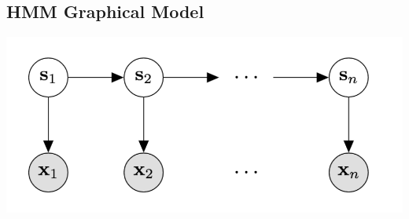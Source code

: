 \documentclass[12pt]{article}
\begin{document}
%
%	
%


\subsection{HMM Graphical Model}

\begin{center}
	\includegraphics[scale = 0.4]{hmm_generic.jpg}
\end{center}
\end{document}
